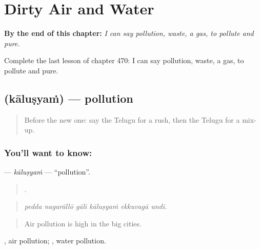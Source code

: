 
\chapter{Dirty Air and Water}
\label{ch:te-dirty-air-and-water}

\begin{chapteropening}
\textbf{By the end of this chapter:} \emph{I can say pollution, waste, a gas, to pollute and pure.}

Complete the last lesson of chapter 470: I can say pollution, waste, a gas, to pollute and pure.
\end{chapteropening}

\section[\texorpdfstring{\te{కాలుష్యం} (kāluṣyaṁ)}{కాలుష్యం (kāluṣyaṁ)}]{ (kāluṣyaṁ) — pollution}

\label{lesson:TE-C470-kalusyam}



\begin{quote}
Before the new one: say the Telugu for a rush, then the Telugu for a mix-up.
\end{quote}

\subsection*{You'll want to know: }
\textbf{} — \emph{kāluṣyaṁ} — \textquotedblleft{}pollution\textquotedblright{}.

\begin{quote}
     .
\end{quote}

\begin{quote}
\emph{pedda nagarāllō gāli kāluṣyaṁ ekkuvagā undi.}
\end{quote}

\begin{quote}
Air pollution is high in the big cities.
\end{quote}

 , air pollution;  , water pollution.

